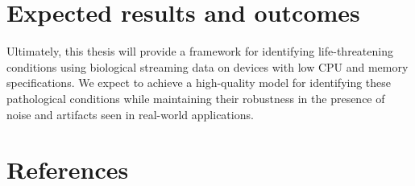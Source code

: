 \documentclass[runningheads]{llncs}
\begin{document}
\hypertarget{expected-results-and-outcomes}{%
\section{Expected results and outcomes}\label{expected-results-and-outcomes}}

Ultimately, this thesis will provide a framework for identifying life-threatening conditions using
biological streaming data on devices with low CPU and memory specifications. We expect to achieve a
high-quality model for identifying these pathological conditions while maintaining their robustness
in the presence of noise and artifacts seen in real-world applications.

\hypertarget{references}{%
\section*{References}\label{references}}
\end{document}
